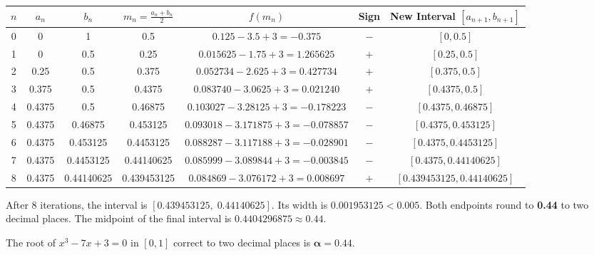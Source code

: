 \documentclass[11pt]{article}
\begin{document}
\begin{exemplebox}[Bisection Iterations for $x^3-7x+3=0$]
\begin{center}
\begin{tabular}{|c|c|c|c|c|c|c|}
\hline
$n$ & $a_n$ & $b_n$ & $m_n=\frac{a_n+b_n}{2}$ & $f(m_n)$ & Sign & New Interval $[a_{n+1},b_{n+1}]$ \\ \hline
0 & 0 & 1 & 0.5 & $0.125-3.5+3=-0.375$ & $-$ & $[0,0.5]$ \\ \hline
1 & 0 & 0.5 & 0.25 & $0.015625-1.75+3=1.265625$ & $+$ & $[0.25,0.5]$ \\ \hline
2 & 0.25 & 0.5 & 0.375 & $0.052734-2.625+3=0.427734$ & $+$ & $[0.375,0.5]$ \\ \hline
3 & 0.375 & 0.5 & 0.4375 & $0.083740-3.0625+3=0.021240$ & $+$ & $[0.4375,0.5]$ \\ \hline
4 & 0.4375 & 0.5 & 0.46875 & $0.103027-3.28125+3=-0.178223$ & $-$ & $[0.4375,0.46875]$ \\ \hline
5 & 0.4375 & 0.46875 & 0.453125 & $0.093018-3.171875+3=-0.078857$ & $-$ & $[0.4375,0.453125]$ \\ \hline
6 & 0.4375 & 0.453125 & 0.4453125 & $0.088287-3.117188+3=-0.028901$ & $-$ & $[0.4375,0.4453125]$ \\ \hline
7 & 0.4375 & 0.4453125 & 0.44140625 & $0.085999-3.089844+3=-0.003845$ & $-$ & $[0.4375,0.44140625]$ \\ \hline
8 & 0.4375 & 0.44140625 & 0.439453125 & $0.084869-3.076172+3=0.008697$ & $+$ & $[0.439453125,0.44140625]$ \\ \hline
\end{tabular}
\end{center}
\end{exemplebox}

After 8 iterations, the interval is $[0.439453125,\;0.44140625]$. Its width is $0.001953125 < 0.005$. Both endpoints round to \textbf{0.44} to two decimal places. The midpoint of the final interval is $0.4404296875 \approx 0.44$.

\begin{aretenir}
The root of $x^3-7x+3=0$ in $[0,1]$ correct to two decimal places is $\boldsymbol{\alpha = 0.44}$.
\end{aretenir}
\end{document}
